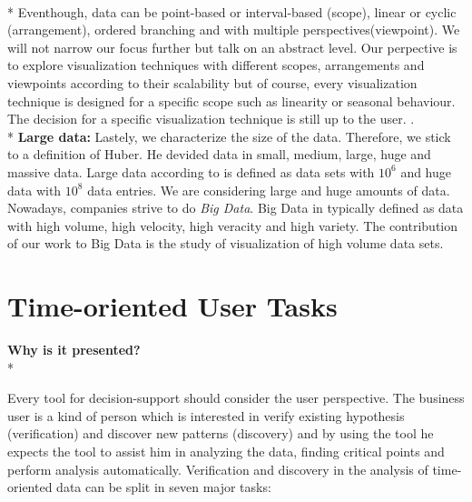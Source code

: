 \\*
Eventhough, data can be point-based or interval-based (scope), linear or cyclic (arrangement), ordered branching and with multiple perspectives(viewpoint)\cite{Aigner2011}. We will not narrow our focus further but talk on an abstract level. Our perpective is to explore visualization techniques with different scopes, arrangements and viewpoints according to their scalability but of course, every visualization technique is designed for a specific scope such as linearity or seasonal behaviour. The decision for a specific visualization technique is still up to the user. .\\*
\textbf{Large data:} Lastely, we characterize the size of the data. Therefore, we stick to a definition of Huber. He devided data in small, medium, large, huge and massive data. Large data according to\cite{Huber1994} is defined as data sets with $10^6$ and huge data with $10^8$ data entries. We are considering large and huge amounts of data. Nowadays, companies strive to do \textit{Big Data}. Big Data in typically defined as data with  high volume, high velocity, high veracity and high variety\cite{Wang2015}. The contribution of our work to Big Data is the study of visualization of high volume data sets.



\section{Time-oriented User Tasks} \label{tasks}
\textbf{Why is it presented?}\\*

Every tool for decision-support should consider the user perspective. The business user is a kind of person which is interested in verify existing hypothesis (verification) and discover new patterns (discovery) and by using the tool he expects the tool to assist him in analyzing the data, finding critical points and perform analysis automatically\cite{Brachman1996}. Verification and discovery in the analysis of time-oriented data can be split in seven major tasks\cite{Esling2012}:

